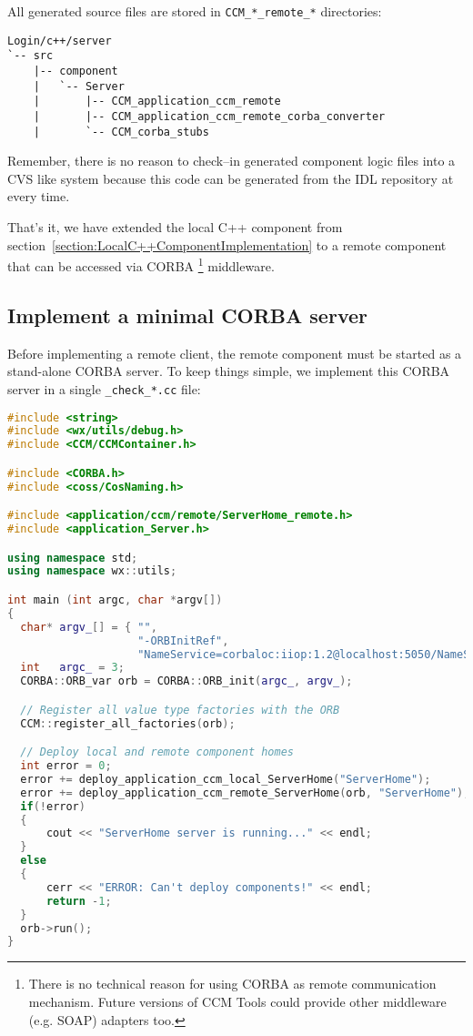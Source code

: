 All generated source files are stored in {\tt CCM\_*\_remote\_*} directories:
\begin{footnotesize}
\begin{verbatim}
Login/c++/server
`-- src
    |-- component
    |   `-- Server
    |       |-- CCM_application_ccm_remote
    |       |-- CCM_application_ccm_remote_corba_converter
    |       `-- CCM_corba_stubs
\end{verbatim}
\end{footnotesize}

Remember, there is no reason to check--in generated component logic files into a
CVS like system because this code can be generated from the IDL repository
at every time.

\vspace{3mm}
That's it, we have extended the local C++ component from 
section~\ref{section:LocalC++ComponentImplementation} to a remote component 
that can be accessed via CORBA
\footnote{
There is no technical reason for using CORBA as remote communication mechanism.
Future versions of CCM Tools could provide other middleware (e.g. SOAP)
adapters too. } 
middleware.

\subsection{Implement a minimal CORBA server}
\label{subsection:ImplementMinimalCorbaAserver}
Before implementing a remote client, the remote component must be started as a
stand-alone CORBA server.
To keep things simple, we implement this CORBA server in a single 
{\tt \_check\_*.cc} file:
\begin{footnotesize}
\begin{lstlisting}[language=C++]
#include <string>
#include <wx/utils/debug.h>
#include <CCM/CCMContainer.h>

#include <CORBA.h>
#include <coss/CosNaming.h>

#include <application/ccm/remote/ServerHome_remote.h>
#include <application_Server.h>

using namespace std;
using namespace wx::utils;

int main (int argc, char *argv[])
{
  char* argv_[] = { "", 
                    "-ORBInitRef", 
                    "NameService=corbaloc:iiop:1.2@localhost:5050/NameService"}; 
  int   argc_ = 3;
  CORBA::ORB_var orb = CORBA::ORB_init(argc_, argv_);

  // Register all value type factories with the ORB  
  CCM::register_all_factories(orb);

  // Deploy local and remote component homes	
  int error = 0;
  error += deploy_application_ccm_local_ServerHome("ServerHome");
  error += deploy_application_ccm_remote_ServerHome(orb, "ServerHome");
  if(!error) 
  {
      cout << "ServerHome server is running..." << endl;
  }
  else 
  {
      cerr << "ERROR: Can't deploy components!" << endl;
      return -1;
  }
  orb->run();
}
\end{lstlisting}
\end{footnotesize}

